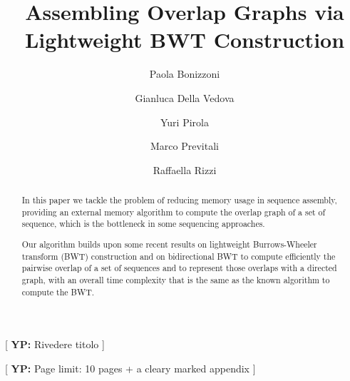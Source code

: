 \documentclass[runningheads,envcountsame,a4paper]{llncs}
\newcommand{\notaestesa}[2]{%
 \marginpar{\color{red!75!black}\textbf{\texttimes}}%
 {\color{red!75!black}%
 [\,\textbullet\,\textsf{\textbf{#1:}} %
 \textsf{\footnotesize#2}\,\textbullet\,]}%
}
\newcommand{\YP}[1]{\notaestesa{YP}{#1}}
\newcommand{\etal}{\textit{et al.}\xspace}
\begin{document}
\title{Assembling Overlap Graphs via Lightweight BWT Construction}

\author{%
  Paola Bonizzoni \and
  Gianluca Della Vedova \and
  Yuri Pirola \and
  Marco Previtali \and
  Raffaella Rizzi
}
\authorrunning{Bonizzoni \etal}


\maketitle

\YP{Rivedere titolo}

\YP{Page limit: 10 pages + a cleary marked appendix}

\begin{abstract}
In this paper we tackle the problem of reducing memory usage in sequence
assembly, providing an external memory algorithm to compute the overlap graph of
a set of sequence, which is the bottleneck in some sequencing approaches.

Our algorithm builds upon some recent results on lightweight Burrows-Wheeler
transform (BWT) construction and on bidirectional BWT to compute efficiently the
pairwise overlap of a set of sequences and to represent those overlaps with a
directed graph, with an overall time complexity that is the same as the known
algorithm to compute the BWT.
\end{abstract}
\end{document}
